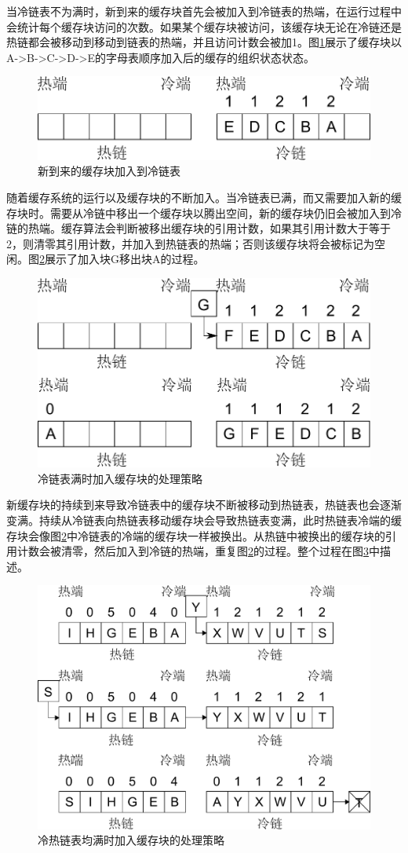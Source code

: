 当冷链表不为满时，新到来的缓存块首先会被加入到冷链表的热端，在运行过程中会统计每个缓存块访问的次数。如果某个缓存块被访问，该缓存块无论在冷链还是热链都会被移动到移动到链表的热端，并且访问计数会被加1。图\ref{fig:replace-algo-2}展示了缓存块以A->B->C->D->E的字母表顺序加入后的缓存的组织状态状态。
\begin{figure}[H]
\centering
\includegraphics[width=0.6\linewidth]{./graph/replace-algo-2}
\caption{新到来的缓存块加入到冷链表}
\label{fig:replace-algo-2}
\end{figure}

随着缓存系统的运行以及缓存块的不断加入。当冷链表已满，而又需要加入新的缓存块时。需要从冷链中移出一个缓存块以腾出空间，新的缓存块仍旧会被加入到冷链的热端。缓存算法会判断被移出缓存块的引用计数，如果其引用计数大于等于2，则清零其引用计数，并加入到热链表的热端；否则该缓存块将会被标记为空闲。图\ref{fig:replace-algo-3}展示了加入块G移出块A的过程。
\begin{figure}[H]
\centering
\includegraphics[width=0.6\linewidth]{./graph/replace-algo-3}
\caption{冷链表满时加入缓存块的处理策略}
\label{fig:replace-algo-3}
\end{figure}

新缓存块的持续到来导致冷链表中的缓存块不断被移动到热链表，热链表也会逐渐变满。持续从冷链表向热链表移动缓存块会导致热链表变满，此时热链表冷端的缓存块会像图\ref{fig:replace-algo-3}中冷链表的冷端的缓存块一样被换出。从热链中被换出的缓存块的引用计数会被清零，然后加入到冷链的热端，重复图\ref{fig:replace-algo-3}的过程。整个过程在图\ref{fig:replace-algo-4}中描述。
\begin{figure}[H]
\centering
\includegraphics[width=0.7\linewidth]{./graph/replace-algo-4}
\caption{冷热链表均满时加入缓存块的处理策略}
\label{fig:replace-algo-4}
\end{figure}

